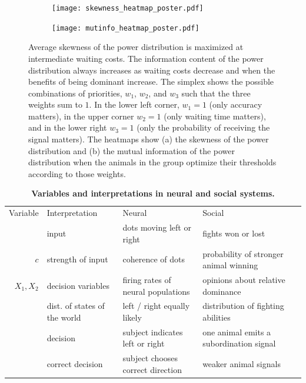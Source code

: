 \documentclass{article}
\newcommand{\ra}[1]{\renewcommand{\arraystretch}{#1}}
\begin{document}
\begin{figure}[ht]
\begin{subfigure}{3.415in}
\caption{}
\texttt{[image: skewness\_heatmap\_poster.pdf]}
\end{subfigure}
\begin{subfigure}{3.415in}
\caption{}
\texttt{[image: mutinfo\_heatmap\_poster.pdf]}
\end{subfigure}
\caption{\label{power} Average skewness of the power distribution is maximized at intermediate waiting costs. The information content of the power distribution always increases as waiting costs decrease and when the benefits of being dominant increase.  The simplex shows the possible combinations of priorities, $w_1$, $w_2$, and $w_3$ such that the three weights sum to $1$.  In the lower left corner, $w_1=1$ (only accuracy matters), in the upper corner $w_2=1$ (only waiting time matters), and in the lower right $w_3=1$ (only the probability of receiving the signal matters).  The heatmaps show (a) the skewness of the power distribution and (b) the mutual information of the power distribution when the animals in the group optimize their thresholds according to those weights.  
}
\end{figure}

\begin{table}[ht]
\centering
\caption{\label{variables}{\bf  Variables and interpretations in neural and social systems.} }
\ra{1.3}
\begin{tabular}{@{}rllll@{}}
Variable & Interpretation & Neural &   Social \\
\cmidrule{1-4} 
& input & dots moving left or right & fights won or lost
\\$c$ & strength of input & coherence of dots & probability of stronger animal winning
\\$X_1,X_2$ & decision variables &  firing rates of neural populations & opinions about relative dominance
\\ & dist. of states of the world & left / right equally likely & distribution of fighting abilities
\\ & decision & subject indicates left or right & one animal emits a subordination signal
\\ & correct decision & subject chooses correct direction & weaker animal signals
\end{tabular}
\end{table}
\end{document}
